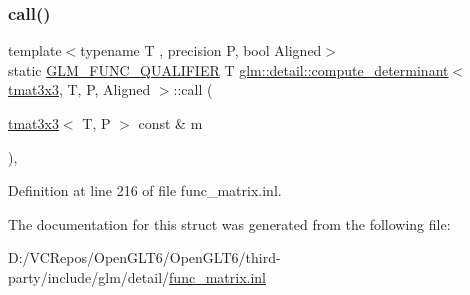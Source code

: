 \subsubsection{\texorpdfstring{call()}{call()}}
{\footnotesize\ttfamily template$<$typename T , precision P, bool Aligned$>$ \\
static \mbox{\hyperlink{setup_8hpp_a33fdea6f91c5f834105f7415e2a64407}{G\+L\+M\+\_\+\+F\+U\+N\+C\+\_\+\+Q\+U\+A\+L\+I\+F\+I\+ER}} T \mbox{\hyperlink{structglm_1_1detail_1_1compute__determinant}{glm\+::detail\+::compute\+\_\+determinant}}$<$ \mbox{\hyperlink{structglm_1_1tmat3x3}{tmat3x3}}, T, P, Aligned $>$\+::call (\begin{DoxyParamCaption}\item[{\mbox{\hyperlink{structglm_1_1tmat3x3}{tmat3x3}}$<$ T, P $>$ const \&}]{m }\end{DoxyParamCaption})\hspace{0.3cm}{\ttfamily [inline]}, {\ttfamily [static]}}



Definition at line 216 of file func\+\_\+matrix.\+inl.



The documentation for this struct was generated from the following file\+:\begin{DoxyCompactItemize}
\item 
D\+:/\+V\+C\+Repos/\+Open\+G\+L\+T6/\+Open\+G\+L\+T6/third-\/party/include/glm/detail/\mbox{\hyperlink{func__matrix_8inl}{func\+\_\+matrix.\+inl}}\end{DoxyCompactItemize}
